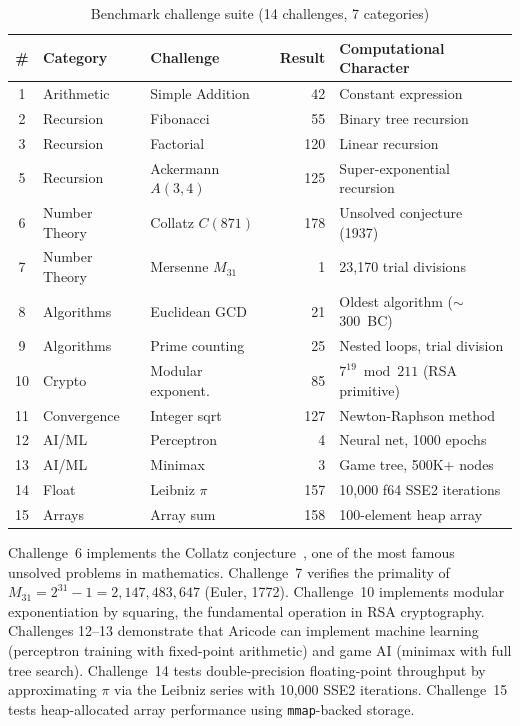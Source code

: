 \documentclass[11pt,a4paper]{article}
\begin{document}
\begin{table}[H]
\centering
\caption{Benchmark challenge suite (14 challenges, 7 categories)}
\label{tab:challenges}
\begin{tabular}{@{}cllrl@{}}
\toprule
\textbf{\#} & \textbf{Category} & \textbf{Challenge} & \textbf{Result} & \textbf{Computational Character} \\
\midrule
1  & Arithmetic & Simple Addition      & 42  & Constant expression \\
2  & Recursion  & Fibonacci            & 55  & Binary tree recursion \\
3  & Recursion  & Factorial            & 120 & Linear recursion \\
5  & Recursion  & Ackermann $A(3,4)$   & 125 & Super-exponential recursion \\
\midrule
6  & Number Theory & Collatz $C(871)$  & 178 & Unsolved conjecture (1937) \\
7  & Number Theory & Mersenne $M_{31}$ & 1   & 23{,}170 trial divisions \\
8  & Algorithms & Euclidean GCD        & 21  & Oldest algorithm ($\sim$300~BC) \\
9  & Algorithms & Prime counting       & 25  & Nested loops, trial division \\
\midrule
10 & Crypto     & Modular exponent.    & 85  & $7^{19} \bmod 211$ (RSA primitive) \\
11 & Convergence & Integer sqrt        & 127 & Newton-Raphson method \\
\midrule
12 & AI/ML      & Perceptron           & 4   & Neural net, 1000 epochs \\
13 & AI/ML      & Minimax              & 3   & Game tree, 500K+ nodes \\
\midrule
14 & Float      & Leibniz $\pi$        & 157 & 10{,}000 f64 SSE2 iterations \\
15 & Arrays     & Array sum            & 158 & 100-element heap array \\
\bottomrule
\end{tabular}
\end{table}

Challenge~6 implements the Collatz conjecture~\cite{collatz1937}, one of the most famous unsolved problems in mathematics. Challenge~7 verifies the primality of $M_{31} = 2^{31} - 1 = 2{,}147{,}483{,}647$ (Euler, 1772). Challenge~10 implements modular exponentiation by squaring, the fundamental operation in RSA cryptography. Challenges 12--13 demonstrate that Aricode can implement machine learning (perceptron training with fixed-point arithmetic) and game AI (minimax with full tree search). Challenge~14 tests double-precision floating-point throughput by approximating $\pi$ via the Leibniz series with 10{,}000 SSE2 iterations. Challenge~15 tests heap-allocated array performance using \texttt{mmap}-backed storage.
\end{document}
